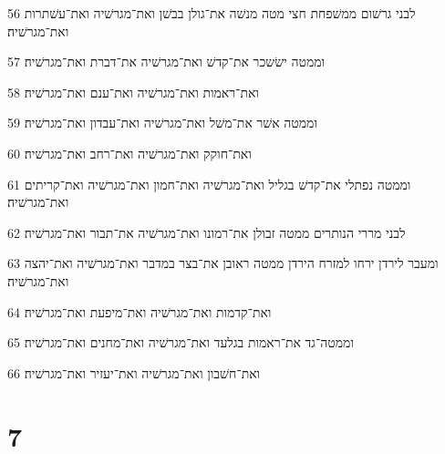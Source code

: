 \par 56 לבני גרשׁום ממשׁפחת חצי מטה מנשׁה את־גולן בבשׁן ואת־מגרשׁיה ואת־עשׁתרות ואת־מגרשׁיה׃
\par 57 וממטה ישׂשכר את־קדשׁ ואת־מגרשׁיה את־דברת ואת־מגרשׁיה׃
\par 58 ואת־ראמות ואת־מגרשׁיה ואת־ענם ואת־מגרשׁיה׃
\par 59 וממטה אשׁר את־משׁל ואת־מגרשׁיה ואת־עבדון ואת־מגרשׁיה׃
\par 60 ואת־חוקק ואת־מגרשׁיה ואת־רחב ואת־מגרשׁיה׃
\par 61 וממטה נפתלי את־קדשׁ בגליל ואת־מגרשׁיה ואת־חמון ואת־מגרשׁיה ואת־קריתים ואת־מגרשׁיה׃
\par 62 לבני מררי הנותרים ממטה זבולן את־רמונו ואת־מגרשׁיה את־תבור ואת־מגרשׁיה׃
\par 63 ומעבר לירדן ירחו למזרח הירדן ממטה ראובן את־בצר במדבר ואת־מגרשׁיה ואת־יהצה ואת־מגרשׁיה׃
\par 64 ואת־קדמות ואת־מגרשׁיה ואת־מיפעת ואת־מגרשׁיה׃
\par 65 וממטה־גד את־ראמות בגלעד ואת־מגרשׁיה ואת־מחנים ואת־מגרשׁיה׃
\par 66 ואת־חשׁבון ואת־מגרשׁיה ואת־יעזיר ואת־מגרשׁיה׃

\chapter{7}

